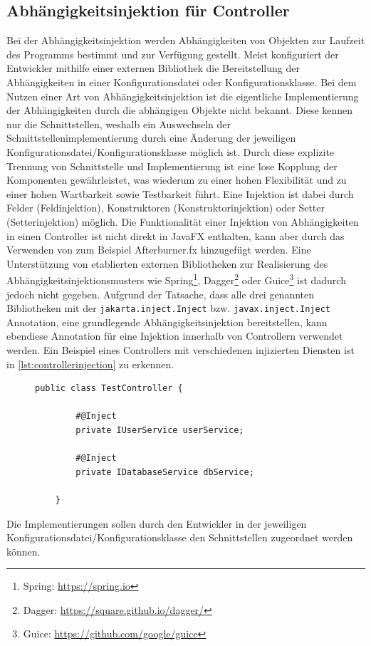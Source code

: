 \subsection{Abhängigkeitsinjektion für Controller}
Bei der Abhängigkeitsinjektion werden Abhängigkeiten von Objekten zur Laufzeit des Programms bestimmt und zur Verfügung gestellt. Meist konfiguriert der Entwickler mithilfe einer externen Bibliothek die Bereitstellung der Abhängigkeiten in einer Konfigurationsdatei oder Konfigurationsklasse. Bei dem Nutzen einer Art von Abhängigkeitsinjektion ist die eigentliche Implementierung der Abhängigkeiten durch die abhängigen Objekte nicht bekannt. Diese kennen nur die Schnittstellen, weshalb ein Auswechseln der Schnittstellenimplementierung durch eine Änderung der jeweiligen Konfigurationsdatei/Konfigurationsklasse möglich ist. Durch diese explizite Trennung von Schnittstelle und Implementierung ist eine lose Kopplung der Komponenten gewährleistet, was wiederum zu einer hohen Flexibilität und zu einer hohen Wartbarkeit sowie Testbarkeit führt. Eine Injektion ist dabei durch Felder (Feldinjektion), Konstruktoren (Konstruktorinjektion) oder Setter (Setterinjektion) möglich. Die Funktionalität einer Injektion von Abhängigkeiten in einen Controller ist nicht direkt in JavaFX enthalten, kann aber durch das Verwenden von zum Beispiel Afterburner.fx hinzugefügt werden. Eine Unterstützung von etablierten externen Bibliotheken zur Realisierung des Abhängigkeitsinjektionsmusters wie Spring\footnote{Spring: \url{https://spring.io}}, Dagger\footnote{Dagger: \url{https://square.github.io/dagger/}} oder Guice\footnote{\label{ft:guice}Guice: \url{https://github.com/google/guice}} ist dadurch jedoch nicht gegeben. Aufgrund der Tatsache, dass alle drei genannten Bibliotheken mit der \texttt{jakarta.inject.Inject} bzw. \texttt{javax.inject.Inject} Annotation, eine grundlegende Abhängigkeitsinjektion bereitstellen, kann ebendiese Annotation für eine Injektion innerhalb von Controllern verwendet werden. Ein Beispiel eines Controllers mit verschiedenen injizierten Diensten ist in \autoref{lst:controllerinjection} zu erkennen.
\begin{figure}[H]
	\centering
	\begin{lstlisting}[caption=Beispiel -- Controller mit injizierten Diensten., captionpos=b, label=lst:controllerinjection]
	public class TestController {
	
		#@Inject
		private IUserService userService;
		
		#@Inject
		private IDatabaseService dbService;
	
	}
	\end{lstlisting}
\end{figure}
\noindent Die Implementierungen sollen durch den Entwickler in der jeweiligen Konfigurationsdatei/Konfigurationsklasse den Schnittstellen zugeordnet werden können.
